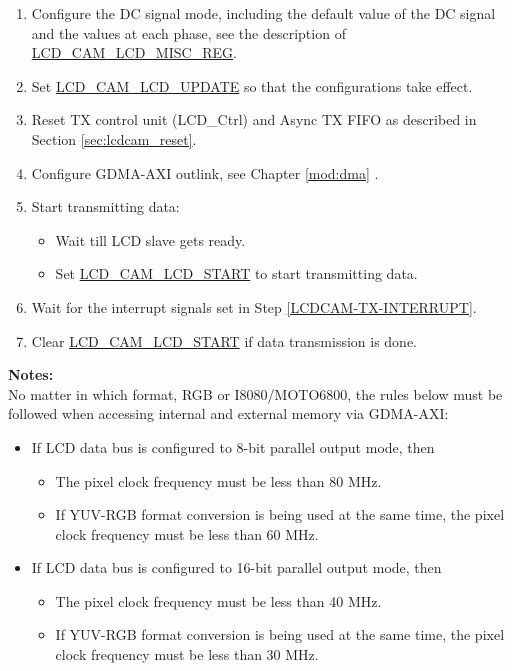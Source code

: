 \documentclass[main\_\_EN.tex]{subfiles}
\begin{document}
\begin{enumerate}
    \item Configure the DC signal mode, including the default value of the DC signal and the values at each phase, see the description of \hyperref[regdesc:LCDCAMLCDMISCREG]{LCD\_CAM\_LCD\_MISC\_REG}.

    \item Set \hyperref[fielddesc:LCDCAMLCDUPDATE]{LCD\_CAM\_LCD\_UPDATE} so that the configurations take effect.

    \item Reset TX control unit (LCD\_Ctrl) and Async TX FIFO as described in Section \ref{sec:lcdcam_reset}.

    \item Configure GDMA-AXI outlink, see Chapter \ref{mod:dma} \textit{}.

    \item Start transmitting data:
    \begin{itemize}
        \item Wait till LCD slave gets ready.
        \item Set \hyperref[fielddesc:LCDCAMLCDSTART]{LCD\_CAM\_LCD\_START} to start transmitting data.
    \end{itemize}

    \item Wait for the interrupt signals set in Step \ref{LCDCAM-TX-INTERRUPT}.

    \item Clear \hyperref[fielddesc:LCDCAMLCDSTART]{LCD\_CAM\_LCD\_START} if data transmission is done.
\end{enumerate}

\textbf{Notes:}\\
No matter in which format, RGB or I8080/MOTO6800, the rules below must be followed when accessing internal and external memory via GDMA-AXI:

\begin{itemize}
    \item If LCD data bus is configured to 8-bit parallel output mode, then
    \begin{itemize}
        \item The pixel clock frequency must be less than 80 MHz.
        \item If YUV-RGB format conversion is being used at the same time, the pixel clock frequency must be less than 60 MHz.
    \end{itemize}
    \item If LCD data bus is configured to 16-bit parallel output mode, then
    \begin{itemize}
        \item The pixel clock frequency must be less than 40 MHz.
        \item If YUV-RGB format conversion is being used at the same time, the pixel clock frequency must be less than 30 MHz.
    \end{itemize}
\end{itemize}
\end{document}
